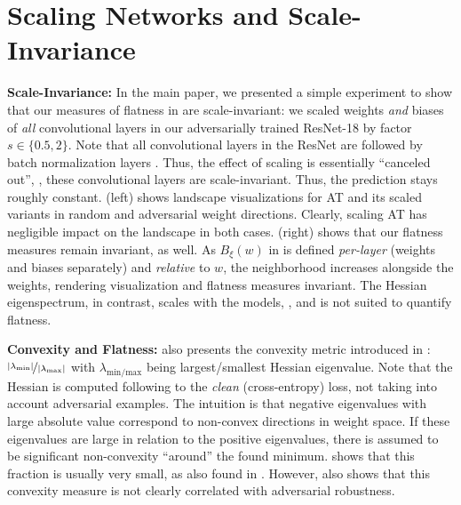\section{Scaling Networks and Scale-Invariance}
\label{sec:supp-scaling}

\textbf{Scale-Invariance:}
%
In the main paper, we presented a simple experiment to show that our measures of flatness in \RCE are scale-invariant: we scaled weights \emph{and} biases of \emph{all} convolutional layers in our adversarially trained ResNet-18 \cite{HeCVPR2016} by factor $s \in \{0.5, 2\}$. Note that all convolutional layers in the ResNet are followed by batch normalization layers \cite{IoffeICML2015}. Thus, the effect of scaling is essentially ``canceled out'', \ie, these convolutional layers are scale-invariant. Thus, the prediction stays roughly constant.  (left) shows \RCE landscape visualizations for AT and its scaled variants in random and adversarial weight directions. Clearly, scaling AT has negligible impact on the \RCE landscape in both cases.  (right) shows that our flatness measures remain invariant, as well. As $B_\xi(w)$ in  is defined \emph{per-layer} (weights and biases separately) and \emph{relative} to $w$, the neighborhood increases alongside the weights, rendering visualization and flatness measures invariant.
The Hessian eigenspectrum, in contrast, scales with the models, \cf {}, and is not suited to quantify flatness.

\textbf{Convexity and Flatness:}
%
 also presents the convexity metric introduced in \cite{LiNIPS2018}: $\nicefrac{|\lambda_{\text{min}}|}{|\lambda_{\text{max}}|}$ with $\lambda_{\text{min/max}}$ being largest/smallest Hessian eigenvalue. Note that the Hessian is computed following \cite{LiNIPS2018} \wrt to the \emph{clean} (cross-entropy) loss, not taking into account adversarial examples. The intuition is that negative eigenvalues with large absolute value correspond to non-convex directions in weight space. If these eigenvalues are large in relation to the positive eigenvalues, there is assumed to be significant non-convexity ``around'' the found minimum.  shows that this fraction is usually very small, as also found in \cite{LiNIPS2018}. However,  also shows that this convexity measure is not clearly correlated with adversarial robustness.

